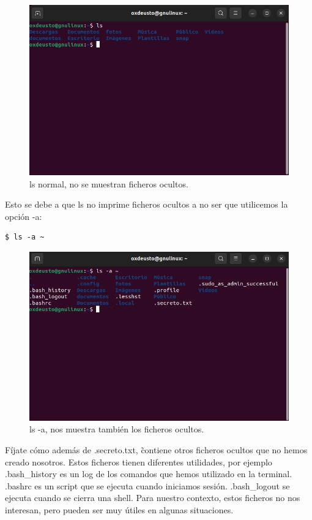\begin{figure}[H]
    \centering
    \includegraphics[width=0.80\linewidth]{resources/images/ls_3.png}
    \caption{ls normal, no se muestran ficheros ocultos.}
\end{figure}

Esto se debe a que ls no imprime ficheros ocultos a no ser que utilicemos la opción -a:
\begin{tcolorbox-code}
\begin{lstlisting}
$ ls -a ~
\end{lstlisting}
\end{tcolorbox-code}

\begin{figure}[H]
    \centering
    \includegraphics[width=0.80\linewidth]{resources/images/ls_4.png}
    \caption{ls -a, nos muestra también los ficheros ocultos.}
\end{figure}

Fíjate cómo además de .secreto.txt, \~ contiene otros ficheros ocultos que no hemos creado nosotros. Estos ficheros tienen diferentes utilidades, por ejemplo .bash\_history es un log de los comandos que hemos utilizado en la terminal. .bashrc es un script que se ejecuta cuando iniciamos sesión. .bash\_logout se ejecuta cuando se cierra una shell. Para nuestro contexto, estos ficheros no nos interesan, pero pueden ser muy útiles en algunas situaciones.

